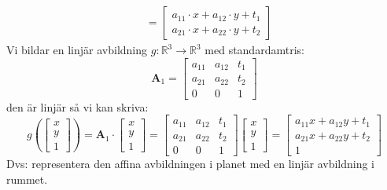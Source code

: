 \begin{Ex}
\begin{align*}
        &= \begin{bmatrix} a_{11} \cdot x + a_{12} \cdot y + t_1\\a_{21} \cdot x + a_{22} \cdot y + t_2\end{bmatrix}
    \end{align*}
    Vi bildar en linjär avbildning $g:\mathbb{R}^3 \rightarrow \mathbb{R}^3$ med standardamtris:
    \[
        \mathbf{A}_1 = \begin{bmatrix} a_{11}&a_{12}&t_1\\a_{21}&a_{22}&t_2\\0&0&1 \end{bmatrix}
    \]
    den är linjär så vi kan skriva:
    \[
        g(\begin{bmatrix} x\\y\\1 \end{bmatrix}) = \mathbf{A}_1 \cdot \begin{bmatrix} x\\y\\1 \end{bmatrix} = \begin{bmatrix} a_{11}&a_{12}&t_1\\a_{21}&a_{22}&t_2\\0&0&1 \end{bmatrix} \begin{bmatrix} x\\y\\1 \end{bmatrix} = \begin{bmatrix} a_{11}x + a_{12}y + t_1\\a_{21}x + a_{22}y + t_2\\1 \end{bmatrix}
    \]
    Dvs: representera den affina avbildningen i planet med en linjär avbildning i rummet.
\end{Ex}


